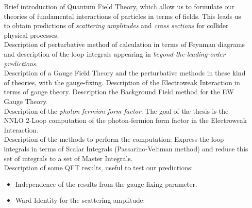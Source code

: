 Brief introduction of Quantum Field Theory, which allow us to formulate our theories of fundamental interactions of particles in terms of fields. This leads us to obtain predictions of \textit{scattering amplitudes} and \textit{cross sections} for collider physical processes. \\
Description of perturbative method of calculation in terms of Feynman diagrams and description of the loop integrals appearing in \textit{beyond-the-leading-order predictions}.\\


Description of a Gauge Field Theory and the perturbative methods in these kind of theories, with the gauge-fixing. Description of the Electroweak Interaction in terms of gauge theory.
Description the Background Field method for the EW Gauge Theory.\\


Description of the \textit{photon-fermion form factor}. The goal of the thesis is the NNLO 2-Loop computation of the photon-fermion form factor in the Electroweak Interaction.\\


Description of the methods to perform the computation: Express the loop integrals in terms of Scalar Integrals (Passarino-Veltman method) and reduce this set of integrals to a set of Master Integrals.\\ 

Description of some QFT results, useful to test our predictions:

\begin{itemize}
	\item Independence of the results from the gauge-fixing parameter.
	\item Ward Identity for the scattering amplitude:
\end{itemize}



